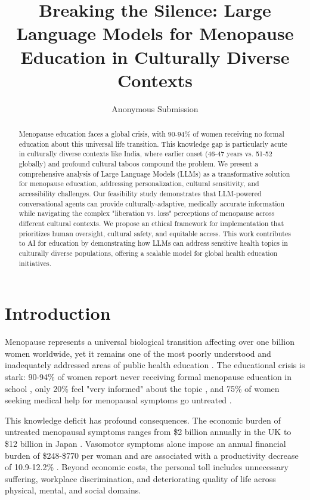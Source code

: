 \documentclass[letterpaper]{article} %
\title{Breaking the Silence: Large Language Models for Menopause Education in Culturally Diverse Contexts}
\author{
    Anonymous Submission
}
\begin{document}
\maketitle

\begin{abstract}
Menopause education faces a global crisis, with 90-94\% of women receiving no formal education about this universal life transition. This knowledge gap is particularly acute in culturally diverse contexts like India, where earlier onset (46-47 years vs. 51-52 globally) and profound cultural taboos compound the problem. We present a comprehensive analysis of Large Language Models (LLMs) as a transformative solution for menopause education, addressing personalization, cultural sensitivity, and accessibility challenges. Our feasibility study demonstrates that LLM-powered conversational agents can provide culturally-adaptive, medically accurate information while navigating the complex "liberation vs. loss" perceptions of menopause across different cultural contexts. We propose an ethical framework for implementation that prioritizes human oversight, cultural safety, and equitable access. This work contributes to AI for education by demonstrating how LLMs can address sensitive health topics in culturally diverse populations, offering a scalable model for global health education initiatives.
\end{abstract}

\section{Introduction}

Menopause represents a universal biological transition affecting over one billion women worldwide, yet it remains one of the most poorly understood and inadequately addressed areas of public health education \cite{who2023menopause}. The educational crisis is stark: 90-94\% of women report never receiving formal menopause education in school \cite{ucl2023menopause}, only 20\% feel "very informed" about the topic \cite{essity2023menopause}, and 75\% of women seeking medical help for menopausal symptoms go untreated \cite{crmc2023knowledge}.

This knowledge deficit has profound consequences. The economic burden of untreated menopausal symptoms ranges from \$2 billion annually in the UK to \$12 billion in Japan \cite{impactsofmenopause2023}. Vasomotor symptoms alone impose an annual financial burden of \$248-\$770 per woman and are associated with a productivity decrease of 10.9-12.2\% \cite{impactsofmenopause2023}. Beyond economic costs, the personal toll includes unnecessary suffering, workplace discrimination, and deteriorating quality of life across physical, mental, and social domains.
\end{document}
